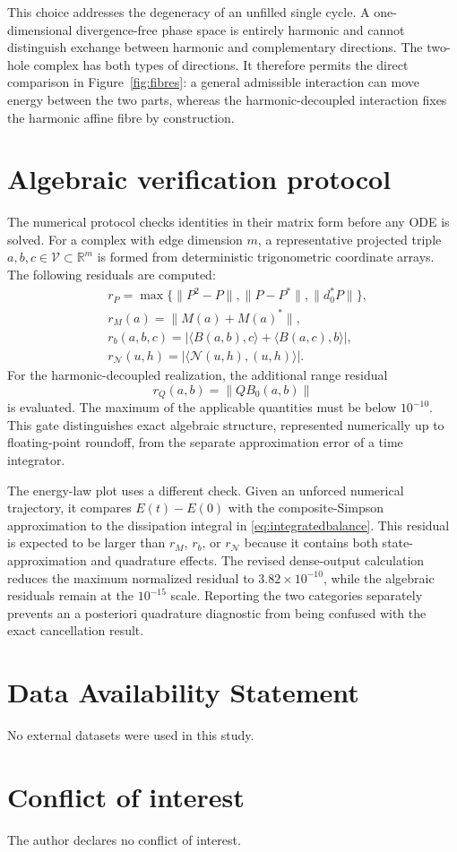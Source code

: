 \documentclass[11pt]{article}
\theoremstyle{remark}
\begin{document}
This choice addresses the degeneracy of an unfilled single cycle. A one-dimensional divergence-free phase space is entirely harmonic and cannot distinguish exchange between harmonic and complementary directions. The two-hole complex has both types of directions. It therefore permits the direct comparison in Figure~\ref{fig:fibres}: a general admissible interaction can move energy between the two parts, whereas the harmonic-decoupled interaction fixes the harmonic affine fibre by construction.

\section{Algebraic verification protocol}

The numerical protocol checks identities in their matrix form before any ODE is solved. For a complex with edge dimension $m$, a representative projected triple $a,b,c\in\mathcal V\subset\mathbb R^m$ is formed from deterministic trigonometric coordinate arrays. The following residuals are computed:
\begin{align*}
&r_P=\max\{\|P^2-P\|,\|P-P^*\|,\|d_0^*P\|\},\\
&r_M(a)=\|M(a)+M(a)^*\|,\\
&r_b(a,b,c)=\bigl|\langle B(a,b),c\rangle+\langle B(a,c),b\rangle\bigr|,\\
&r_{\mathcal N}(u,h)=\bigl|\langle\mathcal N(u,h),(u,h)\rangle\bigr|.
\end{align*}
For the harmonic-decoupled realization, the additional range residual
\[
r_Q(a,b)=\|QB_0(a,b)\|
\]
is evaluated. The maximum of the applicable quantities must be below $10^{-10}$. This gate distinguishes exact algebraic structure, represented numerically up to floating-point roundoff, from the separate approximation error of a time integrator.

The energy-law plot uses a different check. Given an unforced numerical trajectory, it compares $E(t)-E(0)$ with the composite-Simpson approximation to the dissipation integral in \eqref{eq:integratedbalance}. This residual is expected to be larger than $r_M$, $r_b$, or $r_{\mathcal N}$ because it contains both state-approximation and quadrature effects. The revised dense-output calculation reduces the maximum normalized residual to $3.82\times10^{-10}$, while the algebraic residuals remain at the $10^{-15}$ scale. Reporting the two categories separately prevents an a posteriori quadrature diagnostic from being confused with the exact cancellation result.

\section*{Data Availability Statement}
No external datasets were used in this study. 

\section*{Conflict of interest}
The author declares no conflict of interest.



\end{document}
